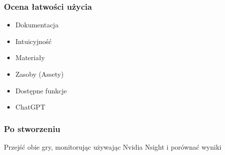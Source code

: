       \begin{frame} 
        \frametitle{Ocena łatwości użycia}
        \begin{itemize}
          \item Dokumentacja
          \item Intuicyjność
          \item Materiały 
          \item Zasoby (Assety)  
	  \item Dostępne funkcje
	  \item ChatGPT
        \end{itemize}
      \end{frame}



      \begin{frame} 
        \frametitle{Po stworzeniu}
        Przejść obie gry, monitorując używając Nvidia Nsight i porównać wyniki
      \end{frame}


